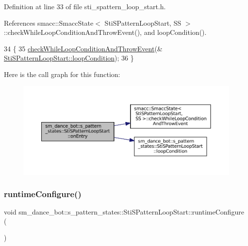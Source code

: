Definition at line 33 of file sti\+\_\+spattern\+\_\+loop\+\_\+start.\+h.



References smacc\+::\+Smacc\+State$<$ Sti\+S\+Pattern\+Loop\+Start, S\+S $>$\+::check\+While\+Loop\+Condition\+And\+Throw\+Event(), and loop\+Condition().


\begin{DoxyCode}
34   \{
35     \hyperlink{classsmacc_1_1SmaccState_a80082718f226bebedb589f0c4696001d}{checkWhileLoopConditionAndThrowEvent}(&
      \hyperlink{structsm__dance__bot_1_1s__pattern__states_1_1StiSPatternLoopStart_a6ee8949dad84ea1906ec16f209bac199}{StiSPatternLoopStart::loopCondition});
36   \}
\end{DoxyCode}
Here is the call graph for this function\+:
\nopagebreak
\begin{figure}[H]
\begin{center}
\leavevmode
\includegraphics[width=350pt]{structsm__dance__bot_1_1s__pattern__states_1_1StiSPatternLoopStart_a1dccbb9590834aaec90d07dedf0c6d1f_cgraph}
\end{center}
\end{figure}
\mbox{\label{structsm__dance__bot_1_1s__pattern__states_1_1StiSPatternLoopStart_aae264cdbadc3666c5b5c9c4f52c64ce0}} 
\subsubsection{\texorpdfstring{runtime\+Configure()}{runtimeConfigure()}}
{\footnotesize\ttfamily void sm\+\_\+dance\+\_\+bot\+::s\+\_\+pattern\+\_\+states\+::\+Sti\+S\+Pattern\+Loop\+Start\+::runtime\+Configure (\begin{DoxyParamCaption}{ }\end{DoxyParamCaption})\hspace{0.3cm}{\ttfamily [inline]}}




